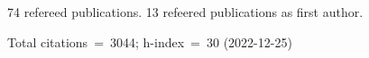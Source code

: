 74 refereed publications. 13 refeered publications as first author.

Total citations~=~3044; h-index~=~30 (2022-12-25)